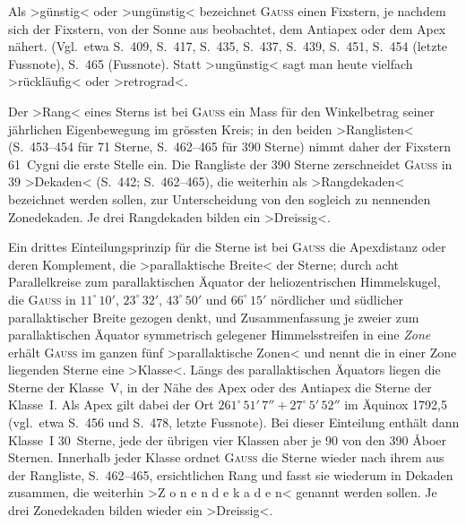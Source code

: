\documentclass[12pt,a4paper]{article}
\theoremstyle{plain}
\theoremstyle{definition}
\theoremstyle{remark}
\begin{document}
\begin{small}
Als \textgreater{}g\"unstig\textless{} oder \textgreater{}ung\"unstig\textless{} bezeichnet \textsc{Gauss} einen Fixstern,
je nachdem sich der Fixstern, von der Sonne aus beobachtet, dem Antiapex oder
dem Apex n\"ahert. (Vgl.~etwa S.~409, S.~417, S.~435, S.~437, S.~439, S.~451,
S.~454 (letzte Fussnote), S.~465 (Fussnote). Statt \textgreater{}ung\"unstig\textless{} sagt man
heute vielfach \textgreater{}r\"uckl\"aufig\textless{} oder \textgreater{}retrograd\textless{}.

Der \textgreater{}Rang\textless{} eines Sterns ist bei \textsc{Gauss} ein Mass f\"ur den Winkelbetrag
seiner j\"ahrlichen Eigenbewegung im gr\"ossten Kreis; in den beiden \textgreater{}Ranglisten\textless{}
(S.~453--454 f\"ur 71 Sterne, S.~462--465 f\"ur 390 Sterne) nimmt daher der Fixstern
61~Cygni die erste Stelle ein. Die Rangliste der 390 Sterne zerschneidet
\textsc{Gauss} in 39 \textgreater{}Dekaden\textless{} (S.~442; S.~462--465), die weiterhin als
\textgreater{}Rangdekaden\textless{} bezeichnet werden sollen, zur Unterscheidung von den sogleich
zu nennenden Zonedekaden. Je drei Rangdekaden bilden ein \textgreater{}Dreissig\textless{}.

Ein drittes Einteilungsprinzip f\"ur die Sterne ist bei \textsc{Gauss} die Apexdistanz
oder deren Komplement, die \textgreater{}parallaktische Breite\textless{} der Sterne; durch acht
Parallelkreise zum parallaktischen \"Aquator der heliozentrischen Himmelskugel,
die \textsc{Gauss} in $11^{\circ}\,10'$, $23^{\circ}\,32'$, $43^{\circ}\,50'$ und $66^{\circ}\,15'$
n\"ordlicher und s\"udlicher parallaktischer Breite gezogen denkt, und Zusammenfassung
je zweier zum parallaktischen \"Aquator symmetrisch gelegener Himmelsstreifen in
eine \textit{Zone} erh\"alt \textsc{Gauss} im ganzen f\"unf \textgreater{}parallaktische Zonen\textless{} und
nennt die in einer Zone liegenden Sterne eine \textgreater{}Klasse\textless{}. L\"angs des parallaktischen
\"Aquators liegen die Sterne der Klasse~V, in der N\"ahe des Apex oder des Antiapex
die Sterne der Klasse~I. Als Apex gilt dabei der Ort $261^{\circ}\,51'\,7'' + 27^{\circ}\,5'\,52''$
im \"Aquinox 1792,5 (vgl.~etwa S.~456 und S.~478, letzte Fussnote). Bei dieser
Einteilung enth\"alt dann Klasse~I 30~Sterne, jede der \"ubrigen vier Klassen aber
je 90 von den 390 \AA boer Sternen. Innerhalb jeder Klasse ordnet \textsc{Gauss} die
Sterne wieder nach ihrem aus der Rangliste, S.~462--465, ersichtlichen Rang und
fasst sie wiederum in Dekaden zusammen, die weiterhin \textgreater{}Z o n e n d e k a d e n\textless{}
genannt werden sollen. Je drei Zonedekaden bilden wieder ein \textgreater{}Dreissig\textless{}.


\end{small}
\end{document}
